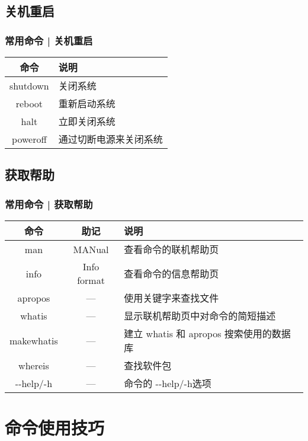 \subsection{关机重启}
\begin{frame}
  \frametitle{常用命令 | \alert{关机重启}}
  \begin{table}
    \centering
    \begin{tabularx}{0.9\textwidth}{cX}
      \hline
      \rowcolor{blue!50}命令 & 说明\\
      \hline
      shutdown & 关闭系统\\
      reboot & 重新启动系统\\
      halt & 立即关闭系统\\
      poweroff & 通过切断电源来关闭系统\\
      \hline
    \end{tabularx}
  \end{table}
\end{frame}

\subsection{获取帮助}
\begin{frame}[fragile]
  \frametitle{常用命令 | \alert{获取帮助}}
  \begin{table}
    \centering
    \begin{tabularx}{0.9\textwidth}{ccX}
      \hline
      \rowcolor{blue!50}命令 & 助记 & 说明\\
      \hline
      man & MANual & 查看命令的联机帮助页\\
      info & Info format & 查看命令的信息帮助页\\
      apropos & --- & 使用关键字来查找文件\\
      whatis & --- & 显示联机帮助页中对命令的简短描述\\
      makewhatis & --- & 建立 whatis 和 apropos 搜索使用的数据库\\
      whereis & --- & 查找软件包\\
      -\!-help/-h & --- & 命令的 -\!-help/-h选项\\
      \hline
    \end{tabularx}
  \end{table}
\end{frame}


\section{命令使用技巧}
